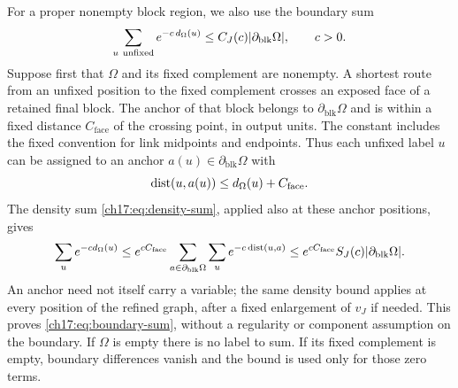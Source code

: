 For a proper nonempty block region, we also use the boundary sum
\begin{equation}\label{ch17:eq:boundary-sum}
 \sum_{u\ \mathrm{unfixed}}e^{-c\,d_\Omega(u)}\le C_J(c)\lvert \partial_{\mathrm{blk}}\Omega\rvert,\qquad c>0.
\end{equation}
Suppose first that $\Omega$ and its fixed complement are nonempty. A shortest route from an unfixed position to the fixed complement crosses an exposed face of a retained final block. The anchor of that block belongs to $\partial_{\mathrm{blk}}\Omega$ and is within a fixed distance $C_{\mathrm{face}}$ of the crossing point, in output units. The constant includes the fixed convention for link midpoints and endpoints. Thus each unfixed label $u$ can be assigned to an anchor $a(u)\in\partial_{\mathrm{blk}}\Omega$ with
\[
 \operatorname{dist}(u,a(u))\le d_\Omega(u)+C_{\mathrm{face}}.
\]
The density sum \eqref{ch17:eq:density-sum}, applied also at these anchor positions, gives
\[
 \sum_u e^{-c d_\Omega(u)}
 \le e^{cC_{\mathrm{face}}}
       \sum_{a\in\partial_{\mathrm{blk}}\Omega}\sum_u e^{-c\operatorname{dist}(u,a)}
 \le e^{cC_{\mathrm{face}}}S_J(c)\lvert \partial_{\mathrm{blk}}\Omega\rvert.
\]
An anchor need not itself carry a variable; the same density bound applies at every position of the refined graph, after a fixed enlargement of $v_J$ if needed. This proves \eqref{ch17:eq:boundary-sum}, without a regularity or component assumption on the boundary. If $\Omega$ is empty there is no label to sum. If its fixed complement is empty, boundary differences vanish and the bound is used only for those zero terms.

